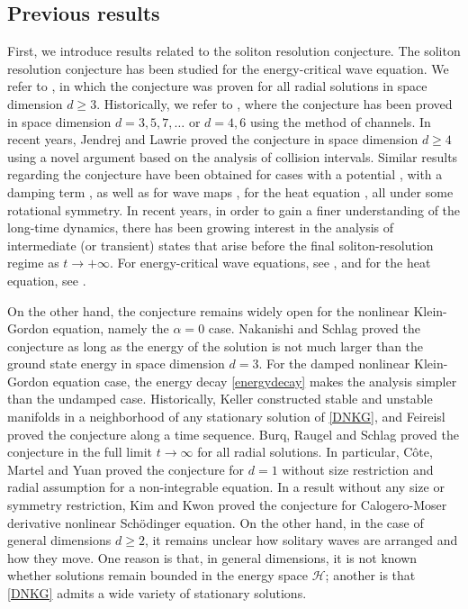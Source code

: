 \documentclass[reqno]{amsart}
\theoremstyle{plain}
\theoremstyle{definition}
\numberwithin{equation}{section}
\newcommand{\1}{\mathbbm{1}}
\begin{document}
\subsection{Previous results}

First, we introduce results related to the soliton resolution conjecture. The soliton resolution conjecture has been studied for the energy-critical wave equation. We refer to \cite{DKM1,JL4}, in which the conjecture was proven for all radial solutions in space dimension $d\geq 3$. Historically, we refer to \cite{CDKM, DJKM, DKM1, DKM2}, where the conjecture has been proved in space dimension $d=3,5,7,\ldots$ or $d=4,6$ using the method of channels. In recent years, Jendrej and Lawrie \cite{JL4} proved the conjecture in space dimension $d\geq 4$ using a novel argument based on the analysis of collision intervals. Similar results regarding the conjecture have been obtained for cases with a potential \cite{JLX,LMZ}, with a damping term \cite{GZ}, as well as for wave maps \cite{DKMM,JL1}, for the heat equation \cite{A1}, all under some rotational symmetry. In recent years, in order to gain a finer understanding of the long-time dynamics, there has been growing interest in the analysis of intermediate (or transient) states that arise before the final soliton-resolution regime as $t\to+\infty$. For energy-critical wave equations, see \cite{S1, S2}, and for the heat equation, see \cite{A2}.



On the other hand, the conjecture remains widely open for the nonlinear Klein-Gordon equation, namely the $\alpha=0$ case. Nakanishi and Schlag \cite{NS} proved the conjecture as long as the energy of the solution is not much larger than the ground state energy in space dimension $d=3$. 
For the damped nonlinear Klein-Gordon equation case, the energy decay \eqref{energydecay} makes the analysis simpler than the undamped case. Historically, Keller \cite{K1} constructed stable and unstable manifolds in a neighborhood of any stationary solution of \eqref{DNKG}, and Feireisl \cite{F} proved the conjecture along a time sequence. Burq, Raugel and Schlag \cite{BRS} proved the conjecture in the full limit $t\to\infty$ for all radial solutions. In particular, C\^{o}te, Martel and Yuan \cite{CMY} proved the conjecture for $d=1$ without size restriction and radial assumption for a non-integrable equation. In a result without any size or symmetry restriction, Kim and Kwon \cite{KK} proved the conjecture for Calogero-Moser derivative nonlinear Sch\"{o}dinger equation. On the other hand, in the case of general dimensions $d\geq 2$, it remains unclear how solitary waves are arranged and how they move. One reason is that, in general dimensions, it is not known whether solutions remain bounded in
the energy space $\mathcal H$; another is that \eqref{DNKG} admits a wide variety of stationary solutions.
\end{document}
